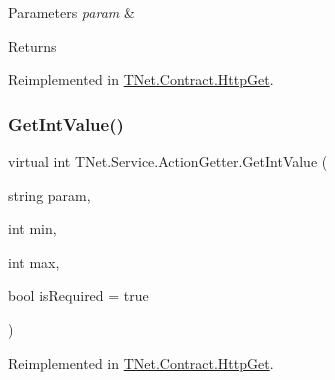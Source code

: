 \begin{DoxyParams}{Parameters}
{\em param} & \\
\hline
\end{DoxyParams}
\begin{DoxyReturn}{Returns}

\end{DoxyReturn}


Reimplemented in \mbox{\hyperlink{class_t_net_1_1_contract_1_1_http_get_a0ad6bffa55b113fc8960d8e10ed6a531}{T\+Net.\+Contract.\+Http\+Get}}.

\mbox{\label{class_t_net_1_1_service_1_1_action_getter_a4a772848d9d936d9dbcedbc6d7553462}} 
\subsubsection{\texorpdfstring{Get\+Int\+Value()}{GetIntValue()}\hspace{0.1cm}{\footnotesize\ttfamily [2/2]}}
{\footnotesize\ttfamily virtual int T\+Net.\+Service.\+Action\+Getter.\+Get\+Int\+Value (\begin{DoxyParamCaption}\item[{string}]{param,  }\item[{int}]{min,  }\item[{int}]{max,  }\item[{bool}]{is\+Required = {\ttfamily true} }\end{DoxyParamCaption})\hspace{0.3cm}{\ttfamily [virtual]}}







Reimplemented in \mbox{\hyperlink{class_t_net_1_1_contract_1_1_http_get_a78a0c0c2143855f12212941cf17e5af0}{T\+Net.\+Contract.\+Http\+Get}}.

\mbox{\label{class_t_net_1_1_service_1_1_action_getter_aeb35984a4c45e670f876bea9cb450563}} 

